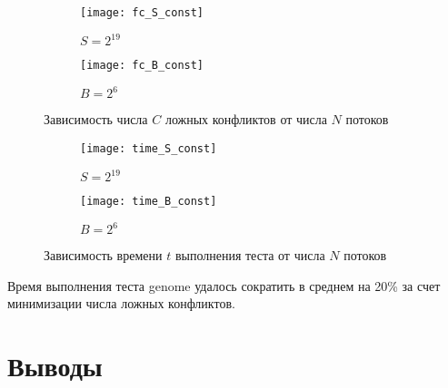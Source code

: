 \begin{figure}
\centering
\begin{subfigure}{0.5\textwidth}
  \centering
  \texttt{[image: fc\_S\_const]}
  \caption{$S = 2^{19}$}
  \label{fc_S_const}
\end{subfigure}%
\begin{subfigure}{0.5\textwidth}
  \centering
  \texttt{[image: fc\_B\_const]}
  \caption{$B = 2^6$}
  \label{fc_B_const}
\end{subfigure}
\caption{Зависимость числа $C$ ложных конфликтов от числа $N$ потоков}
\label{fc_N}
\end{figure}

\begin{figure}
\centering
\begin{subfigure}{0.5\textwidth}
  \centering
  \texttt{[image: time\_S\_const]}
  \caption{$S = 2^{19}$}
  \label{time_S_const}
\end{subfigure}%
\begin{subfigure}{0.5\textwidth}
  \centering
  \texttt{[image: time\_B\_const]}
  \caption{$B = 2^6$}
  \label{time_B_const}
\end{subfigure}
\caption{Зависимость времени $t$ выполнения теста от числа $N$ потоков}
\label{time_N}
\end{figure}

Время выполнения теста genome удалось сократить в среднем на 20\% за счет 
минимизации числа ложных конфликтов.

\section{Выводы}









\clearpage


